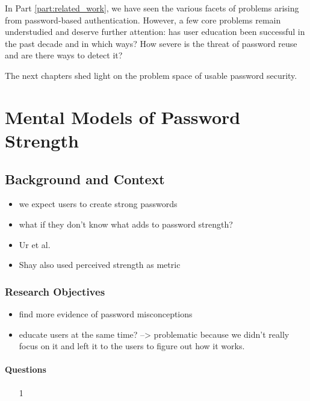 In Part \ref{part:related_work}, we have seen the various facets of problems arising from password-based authentication. However, a few core problems remain understudied and deserve further attention: has user education been successful in the past decade and in which ways? How severe is the threat of password reuse and are there ways to detect it? 

The next chapters shed light on the problem space of usable password security. 


\chapter[Mental Models of Password Strength]{Mental Models of Password Strength}\label{chap:pasdjo}

\section{Background and Context}

\begin{itemize}
\item we expect users to create strong passwords
\item what if they don't know what adds to password strength?
\item Ur et al. \cite{Ur2016PerceptionsPassword}
\item  Shay \etal also used perceived strength as metric \cite{Shay2015SpoonfulOfSugar}
\end{itemize}


\subsection{Research Objectives}
\begin{itemize}
	\item find more evidence of password misconceptions
	\item educate users at the same time? --> problematic because we didn't really focus on it and left it to the users to figure out how it works.
\end{itemize}

\subsubsection{Questions}
\begin{itemize}
\item[1] 
\end{itemize}


